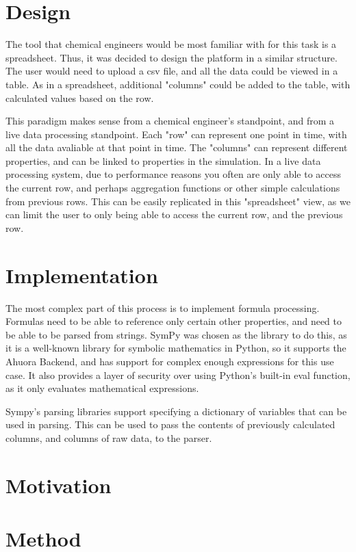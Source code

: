 \section{Design}
The tool that chemical engineers would be most familiar with for this task is a spreadsheet. Thus, it was decided to design the platform in a similar structure. The user would need to upload a csv file, and all the data could be viewed in a table. As in a spreadsheet, additional "columns" could be added to the table, with calculated values based on the row.

This paradigm makes sense from a chemical engineer's standpoint, and from a live data processing standpoint. Each "row" can represent one point in time, with all the data avaliable at that point in time. The "columns" can represent different properties, and can be linked to properties in the simulation. In a live data processing system, due to performance reasons you often are only able to access the current row, and perhaps aggregation functions or other simple calculations from previous rows. This can be easily replicated in this "spreadsheet" view, as we can limit the user to only being able to access the current row, and the previous row.

\section{Implementation}

The most complex part of this process is to implement formula processing. Formulas need to be able to reference only certain other properties, and need to be able to be parsed from strings. SymPy was chosen as the library to do this, as it is a well-known library for symbolic mathematics in Python, so it supports the Ahuora Backend, and has support for complex enough expressions for this use case. It also provides a layer of security over using Python's built-in eval function, as it only evaluates mathematical expressions.

Sympy's parsing libraries support specifying a dictionary of variables that can be used in parsing. This can be used to pass the contents of previously calculated columns, and columns of raw data, to the parser. 











\section{Motivation}

\section{Method}
